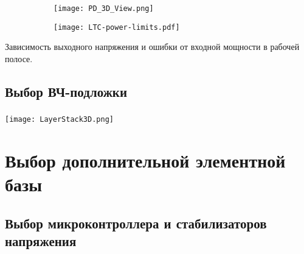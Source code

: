 \documentclass[c]{beamer}  %
\begin{document}
	\begin{frame}
		\frametitle{\insertsection}
		\framesubtitle{\insertsubsection}
		\begin{center}
			\begin{figure}
				\begin{subfigure}{0.5\textwidth}
					\texttt{[image: PD\_3D\_View.png]}
				\end{subfigure}%
				\begin{subfigure}{0.5\textwidth}
					\texttt{[image: LTC-power-limits.pdf]}
				\end{subfigure}
			\end{figure}
		Зависимость выходного напряжения и ошибки от входной мощности в рабочей полосе.
		\end{center}
		
			
	\end{frame}

\subsection{Выбор ВЧ-подложки}

	\begin{frame}
		\frametitle{\insertsection}
		\framesubtitle{\insertsubsection}
		
		\begin{center}
			\texttt{[image: LayerStack3D.png]}
		\end{center}
		
	\end{frame}
	
\section{Выбор дополнительной элементной базы}
\subsection{Выбор микроконтроллера и стабилизаторов напряжения}
\end{document}
